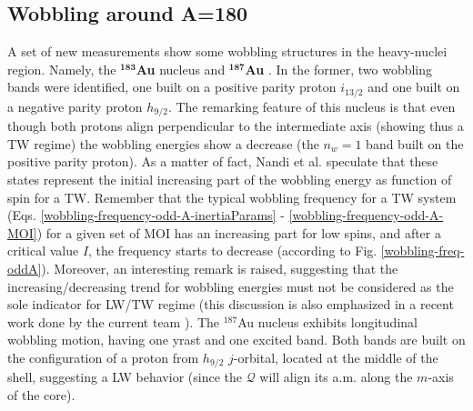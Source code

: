 \subsection{Wobbling around A=180}

A set of new measurements show some wobbling structures in the heavy-nuclei region. Namely, the $^\mathbf{183}$\textbf{Au} \cite{nandi2020first} nucleus and $^\mathbf{187}$\textbf{Au} \cite{sensharma2020longitudinal,sensharma2021wobbling}. In the former, two wobbling bands were identified, one built on a positive parity proton $i_{13/2}$ and one built on a negative parity proton $h_{9/2}$. The remarking feature of this nucleus is that even though both protons align perpendicular to the intermediate axis (showing thus a TW regime) the wobbling energies show a decrease (the $n_w=1$ band built on the positive parity proton). As a matter of fact, Nandi et al. speculate that these states represent the initial increasing part of the wobbling energy as function of spin for a TW. Remember that the typical wobbling frequency for a TW system (Eqs. \ref{wobbling-frequency-odd-A-inertiaParams} - \ref{wobbling-frequency-odd-A-MOI}) for a given set of MOI has an increasing part for low spins, and after a critical value $I$, the frequency starts to decrease (according to Fig. \ref{wobbling-freq-oddA}). Moreover, an interesting remark is raised, suggesting that the increasing/decreasing trend for wobbling energies must not be considered as the sole indicator for LW/TW regime (this discussion is also emphasized in a recent work done by the current team \cite{poenaru2021extensive1,poenaru2021extensive2}). The $^{187}$Au nucleus exhibits longitudinal wobbling motion, having one yrast and one excited band. Both bands are built on the configuration of a proton from $h_{9/2}$ $j$-orbital, located at the middle of the shell, suggesting a LW behavior (since the $\mathcal{Q}$ will align its a.m. along the $m$-axis of the core).

